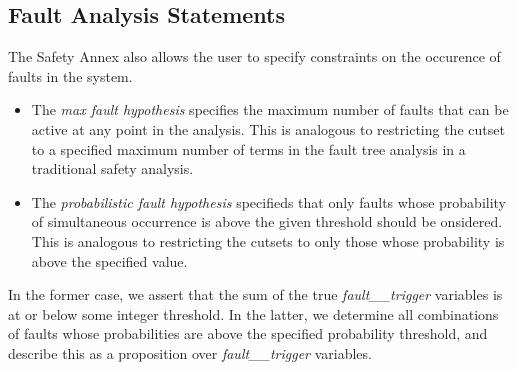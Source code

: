\subsection{Fault Analysis Statements}
The Safety Annex also allows the user to specify constraints on the occurence of faults in the system.  
\begin{itemize}
\item The \emph{max fault hypothesis} specifies the maximum number of faults that can be active at any point in the analysis.  This is analogous to restricting the cutset to a specified maximum number of terms in the fault tree analysis in a traditional safety analysis.  
\item The \emph{probabilistic fault hypothesis} specifieds that only faults whose probability of simultaneous occurrence is above the given threshold should be onsidered.  This is analogous to restricting the cutsets to only those whose probability is above the specified value. 
\end{itemize}

\noindent
In the former case, we assert that the sum of the true {\em fault\_\_trigger} variables is at or below some integer threshold.  In the latter, we determine all combinations of faults whose probabilities are above the specified probability threshold, and describe this as a proposition over {\em fault\_\_trigger} variables. 
%
